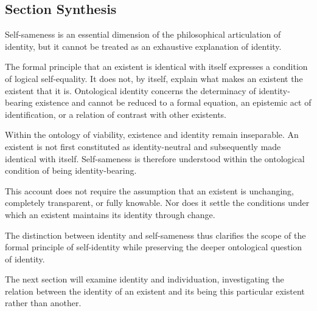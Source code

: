 \subsection{Section Synthesis}

Self-sameness is an essential dimension of the philosophical articulation of identity, but it cannot be treated as an exhaustive explanation of identity.

The formal principle that an existent is identical with itself expresses a condition of logical self-equality. It does not, by itself, explain what makes an existent the existent that it is. Ontological identity concerns the determinacy of identity-bearing existence and cannot be reduced to a formal equation, an epistemic act of identification, or a relation of contrast with other existents.

Within the ontology of viability, existence and identity remain inseparable. An existent is not first constituted as identity-neutral and subsequently made identical with itself. Self-sameness is therefore understood within the ontological condition of being identity-bearing.

This account does not require the assumption that an existent is unchanging, completely transparent, or fully knowable. Nor does it settle the conditions under which an existent maintains its identity through change.

The distinction between identity and self-sameness thus clarifies the scope of the formal principle of self-identity while preserving the deeper ontological question of identity.

The next section will examine identity and individuation, investigating the relation between the identity of an existent and its being this particular existent rather than another.

